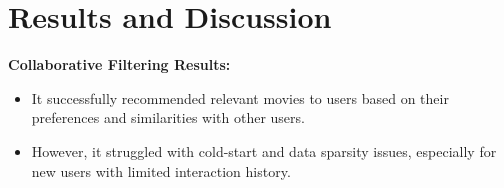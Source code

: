 \documentclass[a4paper]{article}
\theoremstyle{plain}
\theoremstyle{definition}
\begin{document}



    


    \section{Results and Discussion}

        \textbf{Collaborative Filtering Results:}
        \begin{itemize}
            \item It successfully recommended relevant movies to users based on their preferences and similarities with other users.
            \item However, it struggled with cold-start and data sparsity issues, especially for new users with limited interaction history.
        \end{itemize}
\end{document}
